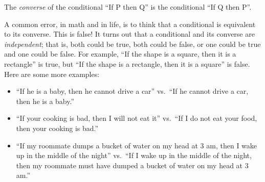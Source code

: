 \documentclass{tufte-book}
\begin{document}



\begin{definition}
  The \emph{converse} of the conditional ``If P then Q'' is the conditional ``If Q then P''.
\end{definition}

A common error, in math and in life, is to think that a conditional is equivalent to its converse. This is false! It turns out that a conditional and its converse are \emph{independent}; that is, both could be true, both could be false, or one could be true and one could be false. For example, ``If the shape is a square, then it is a rectangle'' is true, but ``If the shape is a rectangle, then it is a square'' is false.  Here are some more examples:
\begin{itemize}
    \item ``If he is a baby, then he cannot drive a car'' vs.\ ``If he cannot drive a car, then he is a baby.''
    \item ``If your cooking is bad, then I will not eat it'' vs.\ ``If I do not eat your food, then your cooking is bad.''
    \item ``If my roommate dumps a bucket of water on my head at 3 am, then I wake up in the middle of the night'' vs.\ ``If I wake up in the middle of the night, then my roommate must have dumped a bucket of water on my head at 3 am.''
\end{itemize}
\end{document}
